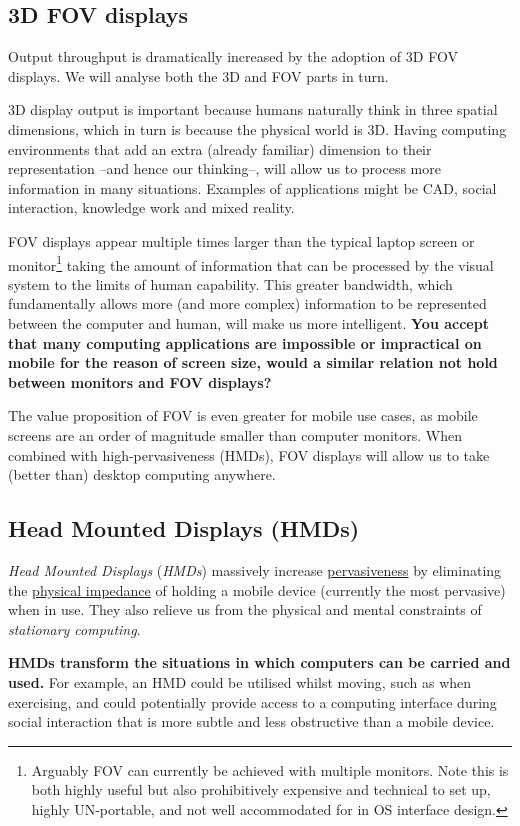 \documentclass[logo,bsc,singlespacing,parskip]{infthesis}
\begin{document}
\subsection{3D FOV displays}
\label{sec:orga0af0db}
Output throughput is dramatically increased by the adoption of 3D FOV displays.
We will analyse both the  3D and FOV parts in turn.

3D display output is important because humans naturally think in three spatial dimensions, which in turn is because the physical world is 3D.
Having computing environments that add an extra (already familiar) dimension to their representation --and hence our thinking--, will allow us to process more information in many situations.
Examples of applications might be CAD, social interaction, knowledge work and mixed reality.

FOV displays appear multiple times larger than the typical laptop screen or monitor\footnote{Arguably FOV can currently be achieved with multiple monitors. Note this is both highly useful but also prohibitively expensive and technical to set up, highly UN-portable, and not well accommodated for in OS interface design.} taking the amount of information that can be processed by the visual system to the limits of human capability.
This greater bandwidth, which fundamentally allows more (and more complex) information to be represented between the computer and human, will make us more intelligent.
\textbf{You accept that many computing applications are impossible or impractical on mobile for the reason of screen size, would a similar relation not hold between monitors and FOV displays?}

The value proposition of FOV is even greater for mobile use cases, as mobile screens are an order of magnitude smaller than computer monitors.
When combined with high-pervasiveness (HMDs), FOV displays will allow us to take (better than) desktop computing anywhere.

\subsection{Head Mounted Displays (HMDs)}
\label{sec:org088970f}
\emph{Head Mounted Displays} (\emph{HMDs}) massively increase \hyperref[pervasiveness]{pervasiveness} by eliminating the \hyperref[physical impedance]{physical impedance} of holding a mobile device (currently the most pervasive) when in use.
They also relieve us from the physical and mental constraints of \emph{stationary computing}.

\textbf{HMDs transform the situations in which computers can be carried and used.}
For example, an HMD could be utilised whilst moving, such as when exercising, and could potentially provide access to a computing interface during social interaction that is more subtle and less obstructive than a mobile device.
\end{document}
